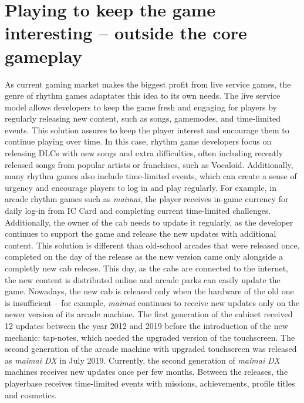 \section{Playing to keep the game interesting -- outside the core gameplay}
As current gaming market makes the biggest profit from live service games, the genre of rhythm games adaptates this idea to its own needs. The live service model allows developers to keep the game fresh and engaging for players by regularly releasing new content, such as songs, gamemodes, and time-limited events. This solution assures to keep the player interest and encourage them to continue playing over time. In this case, rhythm game developers focus on releasing DLCs with new songs and extra difficulties, often including recently released songs from popular artists or franchises, such as Vocaloid. Additionally, many rhythm games also include time-limited events, which can create a sense of urgency and encourage players to log in and play regularly. For example, in arcade rhythm games such as \textit{maimai}, the player receives in-game currency for daily log-in from IC Card and completing current time-limited challenges. Additionally, the owner of the cab needs to update it regularly, as the developer continues to support the game and release the new updates with additional content. This solution is different than old-school arcades that were released once, completed on the day of the release as the new version came only alongside a completly new cab release. This day, as the cabs are connected to the internet, the new content is distributed online and arcade parks can easily update the game. Nowadays, the new cab is released only when the hardware of the old one is insufficient -- for example, \textit{maimai} continues to receive new updates only on the newer version of its arcade machine. The first generation of the cabinet received 12 updates between the year 2012 and 2019 before the introduction of the new mechanic: tap-notes, which needed the upgraded version of the touchscreen. The second generation of the arcade machine with upgraded touchscreen was released as \textit{maimai DX} in July 2019. Currently, the second generation of \textit{maimai DX} machines receives new updates once per few months. Between the releases, the playerbase receives time-limited events with missions, achievements, profile titles and cosmetics.

